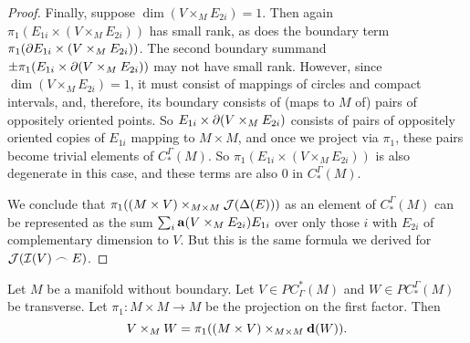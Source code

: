 \begin{proof}
	Finally, suppose $\dim(V \times_M E_{2i}) = 1$.
	Then again $\pi_1(E_{1i} \times (V \times_M E_{2i}))$ has small rank, as does the boundary term $\pi_1(\partial E_{1i} \times (V \times_M E_{2i}))$.
	The second boundary summand $\pm\pi_1(E_{1i} \times \partial(V \times_M E_{2i}))$ may not have small rank.
	However, since $\dim(V \times_M E_{2i}) = 1$, it must consist of mappings of circles and compact intervals, and, therefore, its boundary consists of (maps to $M$ of) pairs of oppositely oriented points.
	So $E_{1i} \times \partial(V \times_M E_{2i})$ consists of pairs of oppositely oriented copies of $E_{1i}$ mapping to $M \times M$, and once we project via $\pi_1$, these pairs become trivial elements of $C^\Gamma_*(M)$.
	So $\pi_1(E_{1i} \times (V \times_M E_{2i}))$ is also degenerate in this case, and these terms are also $0$ in $C^\Gamma_*(M)$.

	\begin{comment}

		We also have
		$$\bd ( V \times_M E_{2i}) = \pm (\bd V) \times_M E_{2i}\pm V \times_M \bd E_{2i}$$.
		Since $V$ is a cocycle, $\bd V$ is a union of trivial or small rank precochains, and hence so is $(\bd V) \times_M E_{2i}$ by Lemma \ref{L: pullback with Q}.
		If $\dim( V \times_M \bd E_{2i})>0$, then $\pi(V \times_M \bd E_{2i})$ has small rank.
		Finally, suppose $\dim (V \times_M \bd E_{2i}) = 0$.
		Then $\dim(V \times_M E_{2i}) = 1$.
		So $V \times_M E_{2i}$ consists of some number of circles and closed intervals in $E_{2i}$, and $V \times_M \bd E_{2i}$ will be the endpoints of those intervals.
		Since these must occur in pairs of opposite signs, then $E_{1i} \times (V \times_M \bd E_{2i})$ will consist of chains $\pm E_{1i} \times pt$, with the points being the points of $V \times_M \bd E_{2i}$.
		Since the points occur in oppositely signed pairs, under $\pi_1$ these pairs become trivial in $M$.
		Altogether then $\pi_1(\bd ( V \times_M E_{2i}))$ is a disjoint union of trivial and small rank precochains.
		So $V \times_M E_{2i} \in Q_*(M)$.
	\end{comment}

	We conclude that $\pi_1( (M \times V)\times_{M \times M}\mathcal{J}(\Delta(E)))$ as an element of $C_*^\Gamma(M)$ can be represented as the sum $\sum_i \mathbf{a}(V \times_M E_{2i})E_{1i}$ over only those $i$ with $E_{2i}$ of complementary dimension to $V$.
	But this is the same formula we derived for $\mathcal{J}(\mathcal{I}(V)\frown E)$.
\end{proof}

\begin{lemma}\label{L: diagonal version of intersection}
	Let $M$ be a manifold without boundary.
	Let $V \in PC^*_\Gamma(M)$ and $W \in PC_*^\Gamma(M)$ be transverse.
	Let $\pi_1 \colon M \times M \to M$ be the projection on the first factor.
	Then $$V \times_M W = \pi_1((M \times V)\times_{M \times M} \mathbf{d}(W)).$$
\end{lemma}

